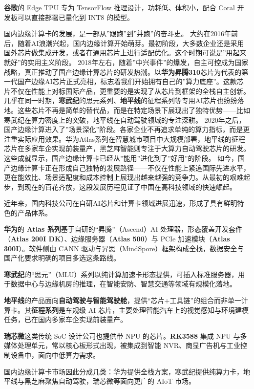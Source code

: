 \textbf{谷歌}的 Edge TPU 专为 TensorFlow 推理设计，功耗低、体积小，配合
Coral 开发板可以直接部署已量化到 INT8 的模型。

国内边缘计算卡的发展，是一部从''跟跑''到''并跑''的奋斗史。
大约在2016年前后，随着AI浪潮兴起，国内边缘计算开始萌芽。最初阶段，大多数企业还是采用国外芯片做集成开发，或者在通用芯片上进行适配优化。这个时期可说是''用起来就好''的实用主义阶段。
2018年左右，随着''中兴事件''的爆发，自主可控成为国家战略，真正推动了国产边缘计算芯片的研发热潮。以\textbf{华为昇腾310}芯片为代表的第一代国产边缘AI芯片正式亮相，标志着我们开始拥有自己的''算力底座''。这款芯片不仅在性能上对标国际产品，更重要的是实现了从芯片到框架的全栈自主创新。
几乎在同一时期，\textbf{寒武纪}的思元系列、\textbf{地平线}的征程系列等专用AI芯片也纷纷落地。这些芯片不再是简单的替代品，而是在特定场景下展现出了独特优势------比如寒武纪在算力密度上的突破，地平线在自动驾驶领域的专注深耕。
2020年之后，国产边缘计算进入了''场景深化''阶段。各家企业不再追求单纯的算力指标，而是更注重实际应用效果。华为Atlas系列在智慧城市项目中大规模部署，地平线的征程芯片在多家车企实现前装量产，黑芝麻智能则专注于大算力自动驾驶芯片的研发。这些成就显示，国产边缘计算卡已经从''能用''进化到了''好用''的阶段。
如今，国产边缘计算卡正在形成自己独特的发展路径------不仅在性能上紧追国际先进水平，更在能效比、场景适配度和成本控制上展现出越来越强的竞争力。从最初的艰难起步，到现在的百花齐放，这段发展历程见证了中国在高科技领域的快速崛起。

近年来，国内科技公司在自研AI芯片和计算卡领域进展迅速，形成了具有鲜明特色的产品体系。

\textbf{华为}的 \textbf{Atlas 系列}基于自研的``昇腾''（Ascend）AI
处理器，形态覆盖开发套件（\textbf{Atlas 200I
DK}）、边缘服务器（\textbf{Atlas 500}）与 PCIe 加速模块（\textbf{Atlas
300I}）。软件侧由 CANN
驱动与昇思（MindSpore）框架构成全栈，数据安全与国产化要求明确的项目多选这条路线。

\textbf{寒武纪}的``思元''（MLU）系列以纯计算加速卡形态提供，可插入标准服务器，用于数据中心与边缘机房的推理，在智能安防、智慧交通等领域有规模化落地。

\textbf{地平线}的产品面向\textbf{自动驾驶与智能驾驶舱}，提供``芯片+工具链''的组合而非单一计算卡。其\textbf{征程系列}是车规级
AI
芯片，主要处理智能汽车上的视觉感知与环境建模任务，已在国内多家车企实现前装量产。

\textbf{瑞芯微}这类传统 SoC 设计公司也提供带 NPU 的芯片。\textbf{RK3588}
集成 NPU 与多媒体处理单元，常以核心板形式出现，被集成到智能
NVR、商显广告机与工业控制设备中，面向中低算力需求。

国内边缘计算卡市场因此分成几类：华为提供全栈方案，寒武纪提供纯算力卡，地平线与黑芝麻聚焦自动驾驶，瑞芯微等面向更广的
AIoT 市场。

